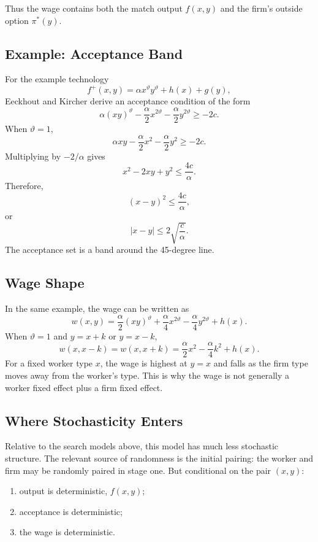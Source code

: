 \documentclass[11pt]{article}
\newcommand{\1}{\mathbf{1}}
\begin{document}
Thus the wage contains both the match output $f(x,y)$ and the firm's outside option $\pi^*(y)$.

\subsection{Example: Acceptance Band}

For the example technology
\[
f^+(x,y)=\alpha x^\vartheta y^\vartheta+h(x)+g(y),
\]
Eeckhout and Kircher derive an acceptance condition of the form
\[
\alpha(xy)^\vartheta-\frac{\alpha}{2}x^{2\vartheta}
-\frac{\alpha}{2}y^{2\vartheta}
\geq -2c.
\]
When $\vartheta=1$,
\[
\alpha xy-\frac{\alpha}{2}x^2-\frac{\alpha}{2}y^2\geq -2c.
\]
Multiplying by $-2/\alpha$ gives
\[
x^2-2xy+y^2\leq \frac{4c}{\alpha}.
\]
Therefore,
\[
(x-y)^2\leq \frac{4c}{\alpha},
\]
or
\[
\boxed{
|x-y|\leq 2\sqrt{\frac{c}{\alpha}}.
}
\]
The acceptance set is a band around the 45-degree line.

\subsection{Wage Shape}

In the same example, the wage can be written as
\[
w(x,y)
=
\frac{\alpha}{2}(xy)^\vartheta
+\frac{\alpha}{4}x^{2\vartheta}
-\frac{\alpha}{4}y^{2\vartheta}
+h(x).
\]
When $\vartheta=1$ and $y=x+k$ or $y=x-k$,
\[
w(x,x-k)=w(x,x+k)
=
\frac{\alpha}{2}x^2-\frac{\alpha}{4}k^2+h(x).
\]
For a fixed worker type $x$, the wage is highest at $y=x$ and falls as the firm type moves away from the worker's type. This is why the wage is not generally a worker fixed effect plus a firm fixed effect.

\subsection{Where Stochasticity Enters}

Relative to the search models above, this model has much less stochastic structure. The relevant source of randomness is the initial pairing: the worker and firm may be randomly paired in stage one. But conditional on the pair $(x,y)$:
\begin{enumerate}
    \item output is deterministic, $f(x,y)$;
    \item acceptance is deterministic;
    \item the wage is deterministic.
\end{enumerate}
\end{document}
